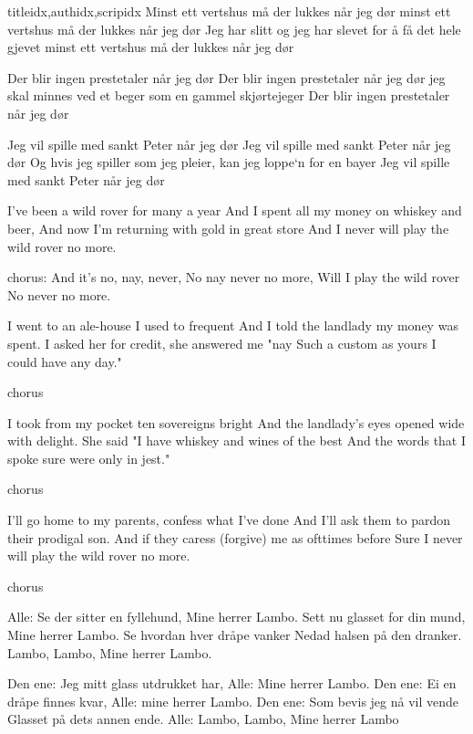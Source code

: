 \documentclass[14pt,letterpaper,norsk]{article}
\begin{document}
\begin{songs}{titleidx,authidx,scripidx}
\beginverse
Minst ett vertshus må der lukkes når jeg dør
minst ett vertshus må der lukkes når jeg dør
Jeg har slitt og jeg har slevet for å få det hele gjevet
minst ett vertshus må der lukkes når jeg dør
\endverse

\beginverse
Der blir ingen prestetaler når jeg dør
Der blir ingen prestetaler når jeg dør
jeg skal minnes ved et beger som en gammel skjørtejeger
Der blir ingen prestetaler når jeg dør
\endverse

\beginverse
Jeg vil spille med sankt Peter når jeg dør
Jeg vil spille med sankt Peter når jeg dør
Og hvis jeg spiller som jeg pleier, kan jeg loppe`n for en bayer
Jeg vil spille med sankt Peter når jeg dør
\endverse
\endsong

\beginverse
I've been a wild rover for many a year 
And I spent all my money on whiskey and beer, 
And now I'm returning with gold in great store 
And I never will play the wild rover no more. 
\endverse

\beginchorus
chorus: And it's no, nay, never, 
No nay never no more, 
Will I play the wild rover 
No never no more.
\endchorus

\beginverse
I went to an ale-house I used to frequent 
And I told the landlady my money was spent. 
I asked her for credit, she answered me "nay 
Such a custom as yours I could have any day." 
\endverse

\beginchorus
chorus
\endchorus

\beginverse
I took from my pocket ten sovereigns bright 
And the landlady's eyes opened wide with delight. 
She said "I have whiskey and wines of the best 
And the words that I spoke sure were only in jest." 
\endverse

\beginchorus
chorus 
\endchorus

\beginverse
I'll go home to my parents, confess what I've done 
And I'll ask them to pardon their prodigal son. 
And if they caress (forgive) me as ofttimes before 
Sure I never will play the wild rover no more. 
\endverse

\beginchorus
chorus
\endchorus
\endsong

\beginverse
Alle: Se der sitter en fyllehund,
Mine herrer Lambo.
Sett nu glasset for din mund,
Mine herrer Lambo.
Se hvordan hver dråpe vanker
Nedad halsen på den dranker.
Lambo, Lambo,
Mine herrer Lambo.
\endverse

\beginverse
Den ene: Jeg mitt glass utdrukket har,
Alle: Mine herrer Lambo.
Den ene: Ei en dråpe finnes kvar,
Alle: mine herrer Lambo.
Den ene: Som bevis jeg nå vil vende
Glasset på dets annen ende.
Alle: Lambo, Lambo,
Mine herrer Lambo
\endverse


\end{songs}
\end{document}
